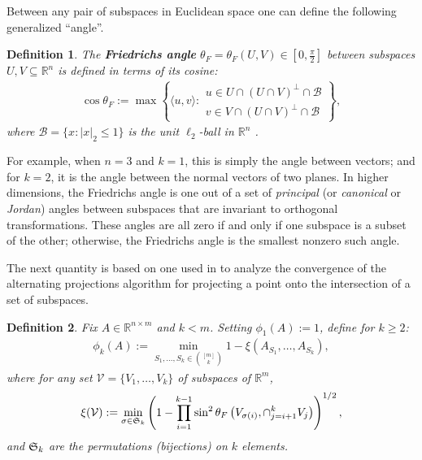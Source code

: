 \documentclass[journal, twocolumn]{IEEEtran}
\newtheorem{definition}{Definition}
\begin{document}
Between any pair of subspaces in Euclidean space one can define the following generalized ``angle''.
\begin{definition}\label{FriedrichsDefinition}
The \textbf{Friedrichs angle} $\theta_F = \theta_F(U,V) \in [0,\frac{\pi}{2}]$ between subspaces $U,V \subseteq \mathbb{R}^n$ is defined in terms of its cosine:
\begin{align*}
\cos{\theta_F} := \max\left\{ \langle u, v \rangle: \substack{ u \in U \cap (U \cap V)^\perp \cap \mathcal{B} \\ v \in V \cap (U \cap V)^\perp \cap \mathcal{B} } \right\},
\end{align*}
where $\mathcal{B} = \{ x: |x|_2 \leq 1\}$ is the unit $\ell_2$-ball in $\mathbb{R}^n$ \cite{Deutsch12}.
\end{definition}
For example, when $n=3$ and $k=1$, this is simply the angle between vectors; and for $k=2$, it is the angle between the normal vectors of two planes. In higher dimensions, the Friedrichs angle is one out of a set of \textit{principal} (or \textit{canonical} or \textit{Jordan}) angles between subspaces that are invariant to orthogonal transformations. These angles are all zero if and only if one subspace is a subset of the other; otherwise, the Friedrichs angle is the smallest nonzero such angle. 

The next quantity is based on one used in \cite{Deutsch12} to analyze the convergence of the alternating projections algorithm for projecting a point onto the intersection of a set of subspaces.


\begin{definition}\label{SpecialSupportSet}
Fix $A \in \mathbb{R}^{n \times m}$ and $k < m$. Setting $\phi_1(A) := 1$, define for $k \geq 2$:
\begin{align*}
\phi_k(A) := \min_{ S_1,\ldots,S_k \in {[m] \choose k} } 1 - \xi( A_{S_1}, \ldots, A_{S_k}),
\end{align*}
where for any set $\mathcal{V} = \{V_1, \ldots, V_k\}$ of subspaces of $\mathbb{R}^m$, 
\begin{align*}
\xi(\mathcal{V}) := \min_{\sigma \in \frak{S}_k} \left(1 - \prod_{i=1}^{k-1} \sin^2  \theta_F \left(V_{\sigma(i)}, \cap_{j=i+1}^k V_j \right)  \right)^{1/2},
\end{align*}
and $\frak{S}_{k}$ are the permutations (bijections) on $k$ elements. 
\end{definition}
\end{document}

